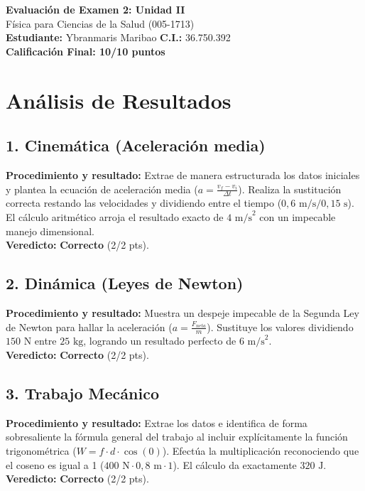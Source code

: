 \documentclass[12pt,letterpaper]{article}
\begin{document}
\begin{center}
    \Large \textbf{Evaluación de Examen 2: Unidad II} \\
    \large Física para Ciencias de la Salud (005-1713) \\
    \vspace{0.5cm}
    \textbf{Estudiante:} Ybranmaris Maribao \quad \textbf{C.I.:} 36.750.392
    \vspace{0.3cm} \\
    \large \textbf{Calificación Final: 10/10 puntos}
\end{center}

\vspace{0.5cm}

\section*{Análisis de Resultados}

\subsection*{1. Cinemática (Aceleración media)}
\textbf{Procedimiento y resultado:} Extrae de manera estructurada los datos iniciales y plantea la ecuación de aceleración media ($a = \frac{v_f - v_i}{\Delta t}$). Realiza la sustitución correcta restando las velocidades y dividiendo entre el tiempo ($0,6 \text{ m/s} / 0,15 \text{ s}$). El cálculo aritmético arroja el resultado exacto de $4 \text{ m/s}^2$ con un impecable manejo dimensional. \\
\textbf{Veredicto:} \textbf{Correcto} (2/2 pts).

\subsection*{2. Dinámica (Leyes de Newton)}
\textbf{Procedimiento y resultado:} Muestra un despeje impecable de la Segunda Ley de Newton para hallar la aceleración ($a = \frac{F_{neta}}{m}$). Sustituye los valores dividiendo $150 \text{ N}$ entre $25 \text{ kg}$, logrando un resultado perfecto de $6 \text{ m/s}^2$. \\
\textbf{Veredicto:} \textbf{Correcto} (2/2 pts).

\subsection*{3. Trabajo Mecánico}
\textbf{Procedimiento y resultado:} Extrae los datos e identifica de forma sobresaliente la fórmula general del trabajo al incluir explícitamente la función trigonométrica ($W = f \cdot d \cdot \cos(0)$). Efectúa la multiplicación reconociendo que el coseno es igual a 1 ($400 \text{ N} \cdot 0,8 \text{ m} \cdot 1$). El cálculo da exactamente $320 \text{ J}$. \\
\textbf{Veredicto:} \textbf{Correcto} (2/2 pts).
\end{document}
